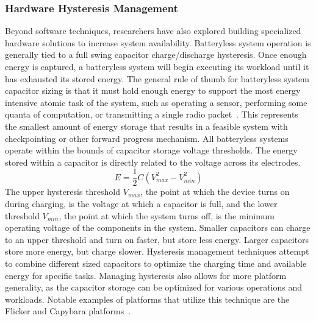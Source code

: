 \subsubsection{Hardware Hysteresis Management}
Beyond software techniques, researchers have also explored building specialized hardware solutions to increase system availability.
Batteryless system operation is generally tied to a full swing capacitor charge/discharge hysteresis. Once enough energy is captured, a batteryless system will begin executing its workload until it has exhausted its stored energy. 
The general rule of thumb for batteryless system capacitor sizing is that it must hold enough energy to support the most energy intensive atomic task of the system, such as operating a sensor, performing some quanta of computation, or transmitting a single radio packet~\cite{nardello2019camaroptera,colinReconfigurable18, shukla2019skinnypower, hesterFlicker17}.
This represents the smallest amount of energy storage that results in a feasible system with checkpointing or other forward progress mechanism.
All batteryless systems operate within the bounds of capacitor storage voltage thresholds. 
The energy stored within a capacitor is directly related to the voltage across its electrodes. 
\begin{equation}
\label{eq:cap_energy}
    E = \frac{1}{2}C(V_{max}^2 - V_{min}^2)
\end{equation}
The upper hysteresis threshold $V_{max}$, the point at which the device turns on during charging, is the voltage at which a capacitor is full, and the lower threshold $V_{min}$, the point at which the system turns off, is the minimum
operating voltage of the components in the system.
Smaller capacitors can charge to an upper
threshold and turn on faster, but store less energy.  Larger capacitors store more energy, but charge slower.
Hysteresis management
techniques attempt to combine different sized capacitors to
optimize the charging time and available energy for specific tasks.
Managing hysteresis also allows for more platform generality, as the capacitor storage can be optimized for various operations and workloads.
Notable examples of platforms that utilize this technique are the Flicker and Capybara platforms~\cite{hesterFlicker17, colinReconfigurable18}.

